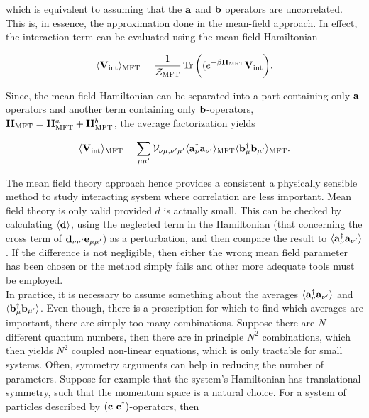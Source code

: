 \documentclass{homework}
\begin{document}
which is equivalent to assuming that the ${\bf a}$ and ${\bf b}$ operators are uncorrelated. This is, in essence, the approximation done in the mean-field approach. In effect, the interaction term can be evaluated using the mean field Hamiltonian 

$$
    \langle {\bf V}_{\textnormal{int}} \rangle_{\textnormal{MFT}} = \frac{1}{\mathcal{Z}_{\textnormal{MFT}}} \Tr \bigg((e^{-\beta {\bf H}_{\textnormal{MFT}}} {\bf V}_{\textnormal{int}}\bigg). 
$$

Since, the mean field Hamiltonian can be separated into a part containing only ${\bf a}$-operators and another term containing only ${\bf b}$-operators, ${\bf H}_{\textnormal{MFT}} = {\bf H}_{\textnormal{MFT}}^a + {\bf H}_{\textnormal{MFT}}^b$, the average factorization yields

\begin{equation}
    \langle {\bf V}_{\textnormal{int}} \rangle_{\textnormal{MFT}} = \sum_{\mu\mu'} {\mathcal{V}}_{\nu\mu, \nu'\mu'} \langle {\bf a}_{\nu}^\dagger {\bf a}_{\nu'} \rangle_{\textnormal{MFT}} \langle {\bf b}_{\mu}^\dagger {\bf b}_{\mu'} \rangle _{\textnormal{MFT}}.
\end{equation}

The mean field theory approach hence provides a consistent a physically sensible method to study interacting system where correlation are less important. Mean field theory is only valid provided $d$ is actually small. This can be checked by calculating $\langle {\bf d} \rangle$, using the neglected term in the Hamiltonian (that concerning the cross term of ${{\bf d}_{\nu \nu'} {\bf e}_{\mu\mu'}}$) as a perturbation, and then compare the result to $\langle {\bf a}_{\nu}^\dagger {\bf a}_{\nu'} \rangle$. If the difference is not negligible, then either the wrong mean field parameter has been chosen or the method simply fails and other more adequate tools must be employed. \\

In practice, it is necessary to assume something about the averages $\langle {\bf a}_{\nu}^\dagger {\bf a}_{\nu'}\rangle$ and $\langle {\bf b}_{\mu}^\dagger {\bf b}_{\mu'} \rangle$. Even though, there is a prescription for which to find which averages are important, there are simply too many combinations. Suppose there are $N$ different quantum numbers, then there are in principle $N^2$ combinations, which then yields $N^2$ coupled non-linear equations, which is only tractable for small systems. Often, symmetry arguments can help in reducing the number of parameters. Suppose for example that the system's Hamiltonian has translational symmetry, such that the momentum space is a natural choice. For a system of particles described by $({\bf c} \textnormal{ } {\bf c}^\dagger)$-operators, then 
\end{document}

